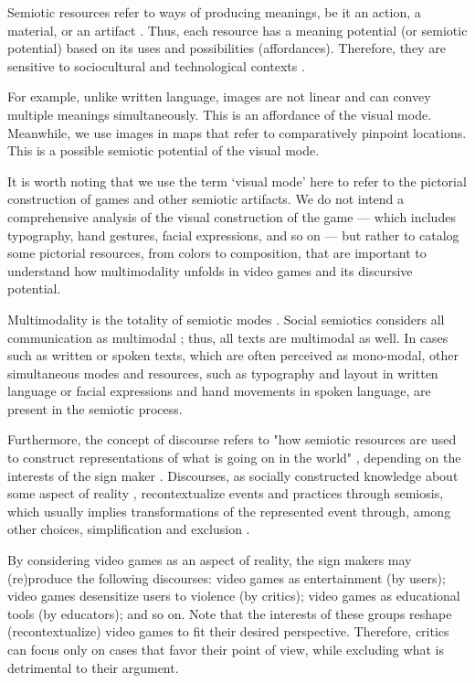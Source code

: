 \documentclass[english]{textolivre}
\begin{document}
Semiotic resources refer to ways of producing meanings, be it an action, a material, or an artifact \cite[p. 285]{van_leeuwen_introducing_2005}. Thus, each resource has a meaning potential (or semiotic potential) based on its uses and possibilities (affordances). Therefore, they are sensitive to sociocultural and technological contexts \cite[p. 285]{van_leeuwen_introducing_2005}.

For example, unlike written language, images are not linear and can convey multiple meanings simultaneously. This is an affordance of the visual mode. Meanwhile, we use images in maps that refer to comparatively pinpoint locations. This is a possible semiotic potential of the visual mode.

It is worth noting that we use the term ‘visual mode’ here to refer to the pictorial construction of games and other semiotic artifacts. We do not intend a comprehensive analysis of the visual construction of the game — which includes typography, hand gestures, facial expressions, and so on — but rather to catalog some pictorial resources, from colors to composition, that are important to understand how multimodality unfolds in video games and its discursive potential.

Multimodality is the totality of semiotic modes \cite[p. 281]{van_leeuwen_introducing_2005}. Social semiotics considers all communication as multimodal \cite{kress_multimodal_2001}; thus, all texts are multimodal as well. In cases such as written or spoken texts, which are often perceived as mono-modal, other simultaneous modes and resources, such as typography and layout in written language or facial expressions and hand movements in spoken language, are present in the semiotic process.

Furthermore, the concept of discourse refers to "how semiotic resources are used to construct representations of what is going on in the world" \cite[p. 90]{van_leeuwen_introducing_2005}, depending on the interests of the sign maker \cite[p. 136]{machin_computer_2005}. Discourses, as socially constructed knowledge about some aspect of reality \cites[p. 4-5]{kress_multimodal_2001}, recontextualize events and practices through semiosis, which usually implies transformations of the represented event through, among other choices, simplification and exclusion \cite[p. 223]{machin_how_2012}.

By considering video games as an aspect of reality, the sign makers may (re)produce the following discourses: video games as entertainment (by users); video games desensitize users to violence (by critics); video games as educational tools (by educators); and so on. Note that the interests of these groups reshape (recontextualize) video games to fit their desired perspective. Therefore, critics can focus only on cases that favor their point of view, while excluding what is detrimental to their argument.
\end{document}
